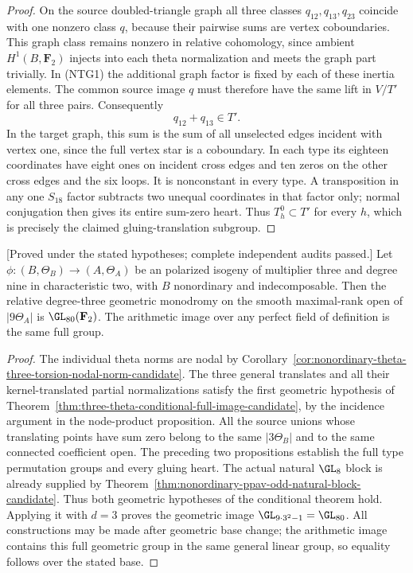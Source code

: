 \begin{proof}
On the source doubled-triangle graph all three classes
$q_{12},q_{13},q_{23}$ coincide with one nonzero class $q$,
because their pairwise sums are vertex coboundaries. This
graph class remains nonzero in relative cohomology, since
ambient $H^1(B,\mathbf F_2)$ injects into each theta
normalization and meets the graph part trivially.
In (NTG1) the additional graph factor is fixed by each of
these inertia elements. The common source image $q$ must
therefore have the same lift in $V/T'$ for all three pairs.
Consequently
\[
                              q_{12}+q_{13}\in T'.       \tag{NTG2}
\]
In the target graph, this sum is the sum of all unselected
edges incident with vertex one, since the full vertex star
is a coboundary. In each type its eighteen coordinates have
eight ones on incident cross edges and ten zeros on the
other cross edges and the six loops. It is nonconstant in
every type. A transposition in any one $S_{18}$ factor
subtracts two unequal coordinates in that factor only;
normal conjugation then gives its entire sum-zero heart.
Thus $T_h^0\subset T'$ for every $h$, which is precisely
the claimed gluing-translation subgroup.
\end{proof}

\begin{theorem}
\label{thm:nonordinary-degree-three-from-neighbour-candidate}
\textup{[Proved under the stated hypotheses; complete independent audits passed.]}
Let $\phi:(B,\Theta_B)\to(A,\Theta_A)$ be an \etale polarized
isogeny of multiplier three and degree nine in characteristic two,
with $B$ nonordinary and indecomposable. Then the relative
degree-three geometric monodromy on the smooth maximal-rank
open of $|9\Theta_A|$ is $\GL_{80}(\mathbf F_2)$.
The arithmetic image over any perfect field of definition is
the same full group.
\end{theorem}
\begin{proof}
The individual theta norms are nodal by
Corollary~\ref{cor:nonordinary-theta-three-torsion-nodal-norm-candidate}.
The three general translates and all their kernel-translated
partial normalizations satisfy the first geometric hypothesis
of Theorem~\ref{thm:three-theta-conditional-full-image-candidate},
by the incidence argument in the node-product proposition.
All the source unions whose translating points have sum zero
belong to the same $|3\Theta_B|$ and to the same connected
coefficient open. The preceding two propositions establish
the full type permutation groups and every gluing heart.
The actual natural $\GL_8$ block is already supplied by
Theorem~\ref{thm:nonordinary-ppav-odd-natural-block-candidate}.
Thus both geometric hypotheses of the conditional theorem
hold. Applying it with $d=3$ proves the geometric image
$\GL_{9\cdot3^2-1}=\GL_{80}$. All constructions may be
made after geometric base change; the arithmetic image
contains this full geometric group in the same general
linear group, so equality follows over the stated base.
\end{proof}

